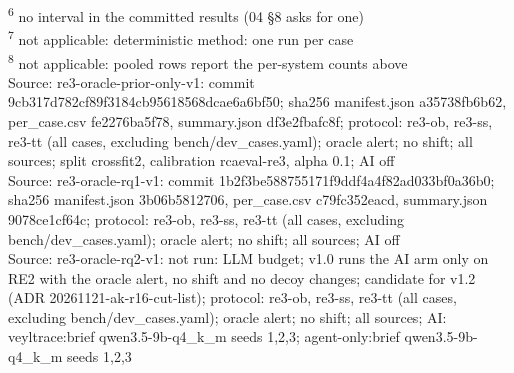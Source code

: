 \begin{table}[t]
\textsuperscript{6} no interval in the committed results (04 \S{}8 asks for one)\\
\textsuperscript{7} not applicable: deterministic method: one run per case\\
\textsuperscript{8} not applicable: pooled rows report the per-system counts above\\
Source: re3-oracle-prior-only-v1: commit 9cb317d782cf89f3184cb95618568dcae6a6bf50; sha256 manifest.json a35738fb6b62, per\_case.csv fe2276ba5f78, summary.json df3e2fbafc8f; protocol: re3-ob, re3-ss, re3-tt (all cases, excluding bench/dev\_cases.yaml); oracle alert; no shift; all sources; split crossfit2, calibration rcaeval-re3, alpha 0.1; AI off\\
Source: re3-oracle-rq1-v1: commit 1b2f3be588755171f9ddf4a4f82ad033bf0a36b0; sha256 manifest.json 3b06b5812706, per\_case.csv c79fc352eacd, summary.json 9078ce1cf64c; protocol: re3-ob, re3-ss, re3-tt (all cases, excluding bench/dev\_cases.yaml); oracle alert; no shift; all sources; AI off\\
Source: re3-oracle-rq2-v1: not run: LLM budget; v1.0 runs the AI arm only on RE2 with the oracle alert, no shift and no decoy changes; candidate for v1.2 (ADR 20261121-ak-r16-cut-list); protocol: re3-ob, re3-ss, re3-tt (all cases, excluding bench/dev\_cases.yaml); oracle alert; no shift; all sources; AI: veyltrace:brief qwen3.5-9b-q4\_k\_m seeds 1,2,3; agent-only:brief qwen3.5-9b-q4\_k\_m seeds 1,2,3\\
\end{table}

